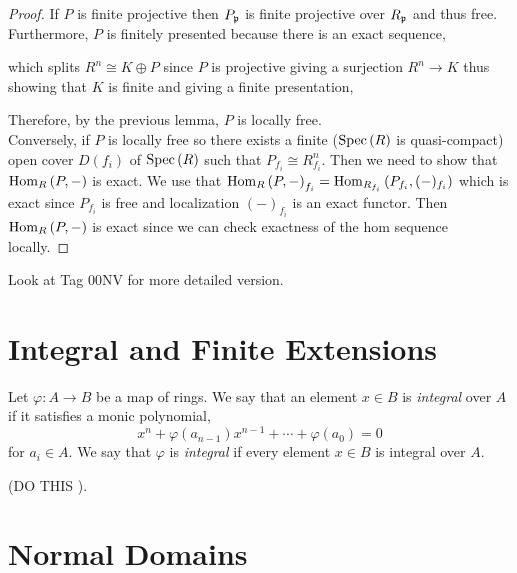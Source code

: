 \documentclass[12pt]{article}
\begin{document}
\begin{proof}
If $P$ is finite projective then $P_{\mathfrak{p}}$ is finite projective over $R_{\mathfrak{p}}$ and thus free. Furthermore, $P$ is finitely presented because there is an exact sequence,
\begin{center}
\end{center}
which splits $R^n \cong K \oplus P$ since $P$ is projective giving a surjection $R^n \to K$ thus showing that $K$ is finite and giving a finite presentation,
\begin{center}
\end{center}
Therefore, by the previous lemma, $P$ is locally free. 
\bigskip\\
Conversely, if $P$ is locally free so there exists a finite ($\mathrm{Spec}\left( R \right)$ is quasi-compact) open cover $D(f_i)$ of $\mathrm{Spec}\left( R \right)$ such that $P_{f_i} \cong R_{f_i}^n$. Then we need to show that $\mathrm{Hom}_{R} \left( P, - \right)$ is exact. We use that $\mathrm{Hom}_{R} \left( P, - \right)_{f_i} = \mathrm{Hom}_{R_{f_i}} \left( P_{f_i}, (-)_{f_i} \right)$ which is exact since $P_{f_i}$ is free and localization $(-)_{f_i}$ is an exact functor. Then $\mathrm{Hom}_{R} \left( P, - \right)$ is exact since we can check exactness of the hom sequence locally. 
\end{proof}

\begin{remark}
Look at Tag 00NV for more detailed version.
\end{remark}

\section{Integral and Finite Extensions}

\begin{defn}
Let $\varphi : A \to B$ be a map of rings. We say that an element $x \in B$ is \textit{integral} over $A$ if it satisfies a monic polynomial,
\[ x^n + \varphi(a_{n-1}) x^{n-1} + \cdots + \varphi(a_0) = 0 \]
for $a_i \in A$. We say that $\varphi$ is \textit{integral} if every element $x \in B$ is integral over $A$.
\end{defn}
(DO THIS ).

\section{Normal Domains}
\end{document}
